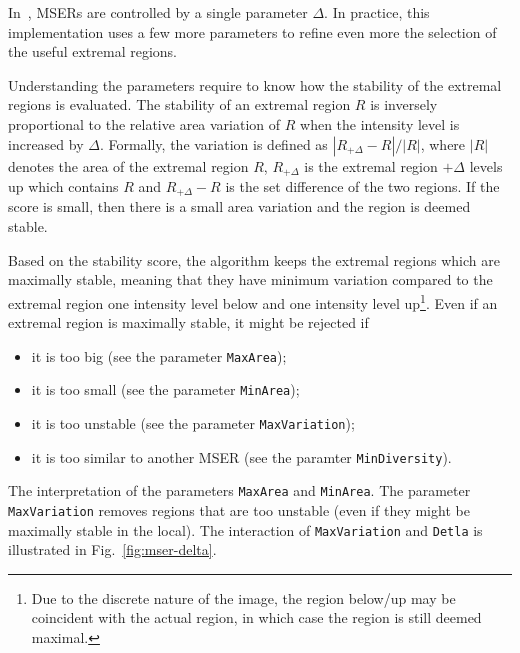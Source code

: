 \documentclass[9.5pt]{article}
\begin{document}
In~\cite{matas03robust}, MSERs are controlled by a single parameter $\Delta$. In practice, this implementation uses a few more parameters to refine even more the selection of the
useful extremal regions.

Understanding the parameters require to know how the stability of the
extremal regions is evaluated. The stability of an extremal region $R$ is inversely proportional to the relative area variation of $R$ when the intensity level is increased by $\Delta$. Formally, the variation is defined as $|R_{+\Delta} - R|/|R|$, where $|R|$ denotes the area of the extremal region $R$, $R_{+\Delta}$ is the extremal region $+\Delta$ levels up which contains $R$ and $R_{+\Delta} - R$ is the set difference of the two regions. If the score is small, then there is a small area variation and the region is deemed stable.

Based on the stability score, the algorithm keeps the extremal regions which are maximally stable, meaning that they have minimum variation compared to the extremal region one intensity level below and one intensity level up\footnote{Due to the discrete nature of the image, the region below/up may be coincident with the actual region, in which case the region is still deemed maximal.}. Even if an extremal region is maximally stable, it might be rejected if
\begin{itemize}
\raggedright
\item it is too big (see the parameter \verb$MaxArea$);
\item it is too small (see the parameter \verb$MinArea$);
\item it is too unstable (see the parameter \verb$MaxVariation$);
\item it is too similar to another MSER (see the paramter \verb$MinDiversity$).
\end{itemize}

The interpretation of the parameters \verb$MaxArea$ and \verb$MinArea$. The parameter \verb$MaxVariation$ removes regions that are too unstable (even if they might be maximally stable in the local). The interaction of \verb$MaxVariation$ and \verb$Detla$ is illustrated in 
Fig.~\ref{fig:mser-delta}.
\end{document}
